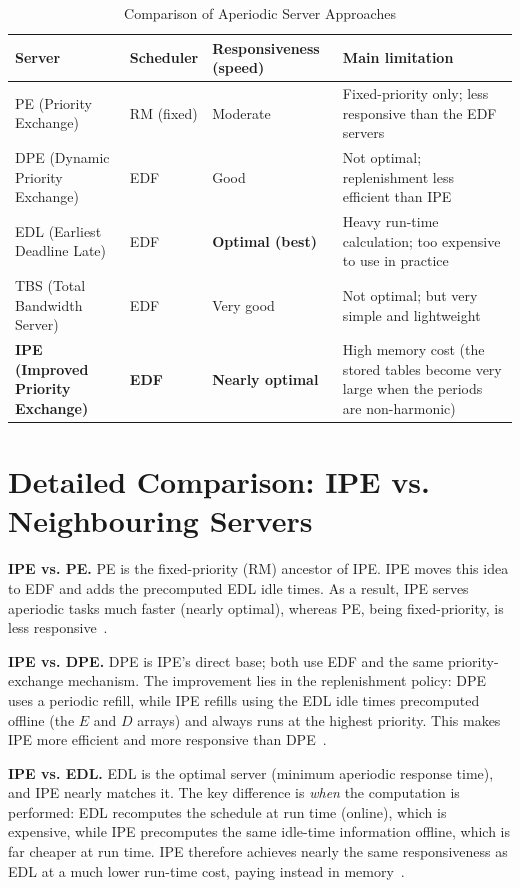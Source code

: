 \documentclass[conference]{IEEEtran}
\begin{document}
\begin{table}[t]
\centering
\caption{Comparison of Aperiodic Server Approaches}
\label{tab:comparison}
\renewcommand{\arraystretch}{1.3}
\begin{tabular}{|p{3.0cm}|p{2.0cm}|p{3.0cm}|p{5.5cm}|}
\hline
\textbf{Server} & \textbf{Scheduler} & \textbf{Responsiveness (speed)} &
\textbf{Main limitation} \\
\hline
PE (Priority Exchange) & RM (fixed) & Moderate &
Fixed-priority only; less responsive than the EDF servers \\
\hline
DPE (Dynamic Priority Exchange) & EDF & Good &
Not optimal; replenishment less efficient than IPE \\
\hline
EDL (Earliest Deadline Late) & EDF & \textbf{Optimal (best)} &
Heavy run-time calculation; too expensive to use in practice \\
\hline
TBS (Total Bandwidth Server) & EDF & Very good &
Not optimal; but very simple and lightweight \\
\hline
\textbf{IPE (Improved Priority Exchange)} & \textbf{EDF} &
\textbf{Nearly optimal} &
High memory cost (the stored tables become very large when the periods are
non-harmonic) \\
\hline
\end{tabular}
\end{table}

\section{Detailed Comparison: IPE vs. Neighbouring Servers}

\noindent\textbf{IPE vs. PE.}
PE is the fixed-priority (RM) ancestor of IPE. IPE moves this idea to EDF and
adds the precomputed EDL idle times. As a result, IPE serves aperiodic tasks
much faster (nearly optimal), whereas PE, being fixed-priority, is less
responsive~\cite{spuri1996}.

\noindent\textbf{IPE vs. DPE.}
DPE is IPE's direct base; both use EDF and the same priority-exchange
mechanism. The improvement lies in the replenishment policy: DPE uses a
periodic refill, while IPE refills using the EDL idle times precomputed
offline (the $E$ and $D$ arrays) and always runs at the highest priority. This
makes IPE more efficient and more responsive than DPE~\cite{spuri1996}.

\noindent\textbf{IPE vs. EDL.}
EDL is the optimal server (minimum aperiodic response time), and IPE nearly
matches it. The key difference is \emph{when} the computation is performed:
EDL recomputes the schedule at run time (online), which is expensive, while
IPE precomputes the same idle-time information offline, which is far cheaper at
run time. IPE therefore achieves nearly the same responsiveness as EDL at a
much lower run-time cost, paying instead in memory~\cite{buttazzo}.
\end{document}
